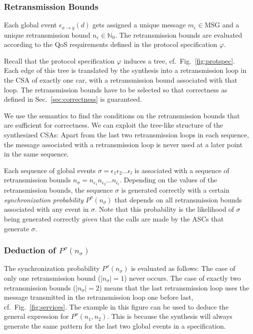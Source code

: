 \documentclass{sig-alternate}
\renewcommand{\v}{\varphi}
\newcommand{\e}{\epsilon}
\newcommand{\MSG}{\mathrm{MSG}}
\newcommand{\len}[1]{|{#1}|}
\newcommand{\define}{\sl}
\newcommand{\fig}[1]{Fig.\ \ref{fig:#1}}
\renewcommand{\sec}[1]{Sec.\ \ref{sec:#1}}
\begin{document}
\subsubsection{Retransmission Bounds} \label{sec:retransmission}

Each global event $\e_{x \rightarrow y}(d)$ gets assigned a unique message $m_{\e} \in \MSG$ and a unique retransmission bound $n_{\e} \in \mathbb{N}_0$. The retransmission bounds are evaluated according to the QoS requirements defined in the protocol specification $\v$.

Recall that the protocol specification $\v$ induces a tree, cf.\ \fig{protspec}. Each edge of this tree is translated by the synthesis into a retransmission loop in the CSA of exactly one car, with a retransmission bound associated with that loop. The retransmission bounds have to be selected so that correctness as defined in \sec{correctness} is guaranteed.

We use the semantics to find the conditions on the retransmission bounds that are sufficient for correctness. We can exploit the tree-like structure of the synthesized CSAs: Apart from the last two retransmission loops in each sequence, the message associated with a retransmission loop is never used at a later point in the same sequence.

Each sequence of global events $\sigma = \e_1\e_2\ldots\e_l$ is associated with a sequence of retransmission bounds $n_{\sigma} = n_{\e_1}n_{\e_2}\ldots n_{\e_l}$. Depending on the values of the retransmission bounds, the sequence $\sigma$ is generated correctly with a certain {\define synchronization probability} $P^{\sigma}(n_{\sigma})$ that depends on all retransmission bounds associated with any event in $\sigma$. Note that this probability is the likelihood of $\sigma$ being generated correctly \emph{given} that the calls are made by the ASCs that generate $\sigma$.


\subsubsection{Deduction of $P^{\sigma}(n_{\sigma})$} \label{sec:Pdeduction}

The synchronization probability $P^{\sigma}(n_{\sigma})$ is evaluated as follows: The case of only one retransmission bound ($\len{n_\sigma} = 1$) never occurs. The case of exactly two retransmission bounds ($\len{n_\sigma} = 2$) means that the last retransmission loop uses the message transmitted in the retransmission loop one before last, cf.\ \fig{services}. The example in this figure can be used to deduce the general expression for $P^{\sigma}(n_1, n_2)$. This is because the synthesis will always generate the same pattern for the last two global events in a specification.
\end{document}
